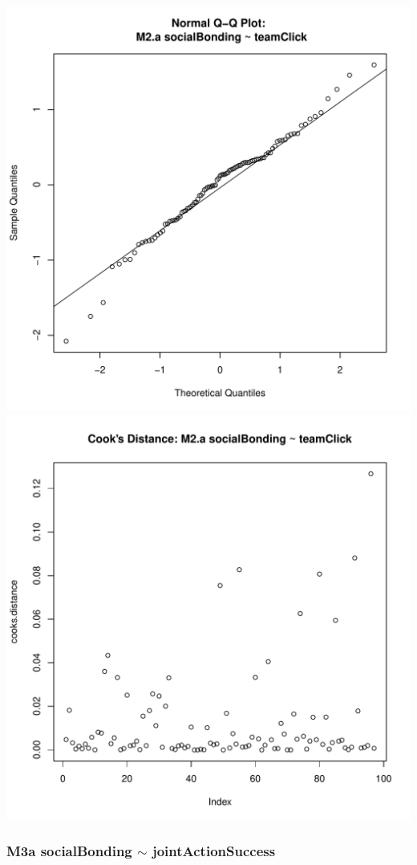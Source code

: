\documentclass[12pt]{report}
\begin{document}
\includegraphics[scale =.4]{../images/MLM2aQQNorm.pdf}
\includegraphics[scale =.4]{../images/MLM2aCooksD.pdf}

\newpage
\subsubsection{M3a socialBonding $\sim$ jointActionSuccess}
\end{document}
